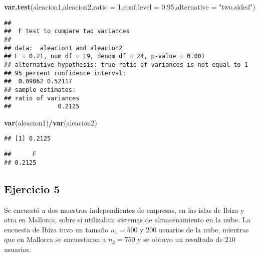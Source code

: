 \documentclass[
]{article}
\newenvironment{Shaded}{\begin{snugshade}}{\end{snugshade}}
\newcommand{\DataTypeTok}[1]{\textcolor[rgb]{0.13,0.29,0.53}{#1}}
\newcommand{\DecValTok}[1]{\textcolor[rgb]{0.00,0.00,0.81}{#1}}
\newcommand{\FloatTok}[1]{\textcolor[rgb]{0.00,0.00,0.81}{#1}}
\newcommand{\KeywordTok}[1]{\textcolor[rgb]{0.13,0.29,0.53}{\textbf{#1}}}
\newcommand{\NormalTok}[1]{#1}
\newcommand{\OperatorTok}[1]{\textcolor[rgb]{0.81,0.36,0.00}{\textbf{#1}}}
\newcommand{\StringTok}[1]{\textcolor[rgb]{0.31,0.60,0.02}{#1}}
\begin{document}
\begin{Shaded}
\begin{Highlighting}[]
\KeywordTok{var.test}\NormalTok{(aleacion1,aleacion2,}\DataTypeTok{ratio =} \DecValTok{1}\NormalTok{,}\DataTypeTok{conf.level =} \FloatTok{0.95}\NormalTok{,}\DataTypeTok{alternative =} \StringTok{"two.sided"}\NormalTok{)}
\end{Highlighting}
\end{Shaded}

\begin{verbatim}
## 
##  F test to compare two variances
## 
## data:  aleacion1 and aleacion2
## F = 0.21, num df = 19, denom df = 24, p-value = 0.001
## alternative hypothesis: true ratio of variances is not equal to 1
## 95 percent confidence interval:
##  0.09062 0.52117
## sample estimates:
## ratio of variances 
##             0.2125
\end{verbatim}

\begin{Shaded}
\begin{Highlighting}[]
\KeywordTok{var}\NormalTok{(aleacion1)}\OperatorTok{/}\KeywordTok{var}\NormalTok{(aleacion2)}
\end{Highlighting}
\end{Shaded}

\begin{verbatim}
## [1] 0.2125
\end{verbatim}

\begin{Shaded}
\end{Shaded}

\begin{verbatim}
##      F 
## 0.2125
\end{verbatim}

\hypertarget{ejercicio-5}{%
\subsection{Ejercicio 5}\label{ejercicio-5}}

Se encuestó a dos muestras independientes de empresas, en las islas de
Ibiza y otra en Mallorca, sobre si utilizaban sistemas de almacenamiento
en la nube. La encuesta de Ibiza tuvo un tamaño \(n_1=500\) y \(200\)
usuarios de la nube, mientras que en Mallorca se encuestaron a
\(n_2=750\) y se obtuvo un resultado de \(210\) usuarios.
\end{document}
